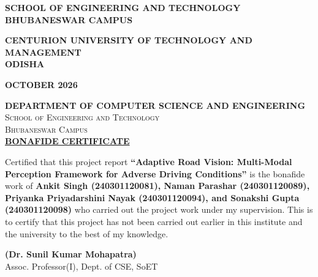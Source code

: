 \documentclass{article}
\begin{document}
\begin{titlepage}
\begin{center}
    
    {\large \textbf{SCHOOL OF ENGINEERING AND TECHNOLOGY}\\
    {\large \textbf{BHUBANESWAR CAMPUS}}\par}
    \vspace{0.3cm}

    {\large \textbf{CENTURION UNIVERSITY OF TECHNOLOGY AND MANAGEMENT \\
    ODISHA}\par}
    \vspace{0.4cm}
       
    {\large \textbf{OCTOBER 2026}}
\end{center}
\end{titlepage}

\newpage

{}

\begin{center}
    {\Large \textbf{DEPARTMENT OF COMPUTER SCIENCE AND ENGINEERING}}\\[0.35cm]
    {\large \textsc{School of Engineering and Technology}}\\
    {\large \textsc{Bhubaneswar Campus}}\\[0.8cm]

    {\LARGE \textbf{\underline{BONAFIDE CERTIFICATE}}}
\end{center}

\vspace{0.4cm}
\begin{justify}
\large Certified that this project report \textbf{``Adaptive Road Vision: Multi-Modal Perception Framework for Adverse Driving Conditions''} is the bonafide work of \textbf{Ankit Singh (240301120081), Naman Parashar (240301120089), Priyanka Priyadarshini Nayak (240301120094), and Sonakshi Gupta (240301120098)} who carried out the project work under my supervision. This is to certify that this project has not been carried out earlier in this institute and the university to the best of my knowledge.
\end{justify}

\vfill

\begin{flushright}
    \large
    \textbf{(Dr. Sunil Kumar Mohapatra)}\\
    Assoc. Professor(I), Dept. of CSE, SoET
\end{flushright}
\end{document}
